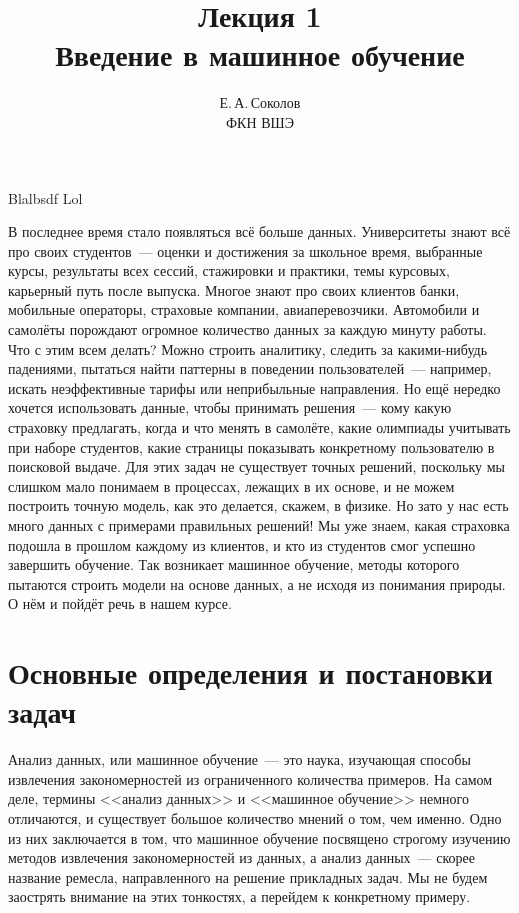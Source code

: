 \documentclass[12pt,fleqn]{article}
\begin{document}
\title{Лекция 1\\Введение в машинное обучение}
\author{Е.\,А.\,Соколов\\ФКН ВШЭ}
\maketitle

Blalbsdf
Lol

В последнее время стало появляться всё больше данных.
Университеты знают всё про своих студентов~--- оценки и достижения за школьное время,
выбранные курсы, результаты всех сессий, стажировки и практики, темы курсовых,
карьерный путь после выпуска.
Многое знают про своих клиентов банки, мобильные операторы, страховые компании, авиаперевозчики.
Автомобили и самолёты порождают огромное количество данных за каждую минуту работы.
Что с этим всем делать?
Можно строить аналитику, следить за какими-нибудь падениями, пытаться найти паттерны в поведении
пользователей~--- например, искать неэффективные тарифы или неприбыльные направления.
Но ещё нередко хочется использовать данные, чтобы принимать решения~--- кому какую страховку предлагать,
когда и что менять в самолёте, какие олимпиады учитывать при наборе студентов,
какие страницы показывать конкретному пользователю в поисковой выдаче.
Для этих задач не существует точных решений, поскольку мы слишком мало понимаем в процессах,
лежащих в их основе, и не можем построить точную модель, как это делается, скажем, в физике.
Но зато у нас есть много данных с примерами правильных решений!
Мы уже знаем, какая страховка подошла в прошлом каждому из клиентов,
и кто из студентов смог успешно завершить обучение.
Так возникает машинное обучение, методы которого пытаются строить модели
на основе данных, а не исходя из понимания природы.
О нём и пойдёт речь в нашем курсе.

\section{Основные определения и постановки задач}
Анализ данных, или машинное обучение~--- это наука, изучающая способы извлечения закономерностей
из ограниченного количества примеров.
На самом деле, термины <<анализ данных>> и <<машинное обучение>> немного отличаются, и существует большое
количество мнений о том, чем именно.
Одно из них заключается в том, что машинное обучение посвящено строгому
изучению методов извлечения закономерностей из данных,
а анализ данных~--- скорее название ремесла, направленного на решение прикладных задач.
Мы не будем заострять внимание на этих тонкостях, а перейдем к конкретному примеру.
\end{document}
